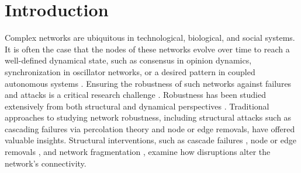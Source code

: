 \documentclass[%
 reprint,
 amsmath,amssymb,
 aip,
]{revtex4-2}
\theoremstyle{italichead}
\theoremstyle{definition}
\begin{document}

\section{Introduction} 





Complex networks are ubiquitous in technological, biological, and social systems. It is often the case that the nodes of these networks evolve over time to reach a well-defined dynamical state, such as consensus in opinion dynamics, synchronization in oscillator networks, or a desired pattern in coupled autonomous systems \cite{6341809, 9356608, 1545539}. Ensuring the robustness of such networks against failures and attacks is a critical research challenge \cite{artime2024robustness}. Robustness has been studied extensively from both structural and dynamical perspectives \cite{granovetter1978threshold, pastor2001epidemic, castellano2009statistical, centola2010spread}. Traditional approaches to studying network robustness, including structural attacks such as cascading failures via percolation theory and node or edge removals, have offered valuable insights.  Structural interventions, such as cascade failures \cite{PhysRevE.66.065102, Buldyrev_2010, PhysRevE.69.045104, motter2004cascade}, node or edge removals \cite{DENG2007714, motter2004cascade}, and network fragmentation \cite{requiao2015fast}, examine how disruptions alter the network's connectivity. 
\end{document}
